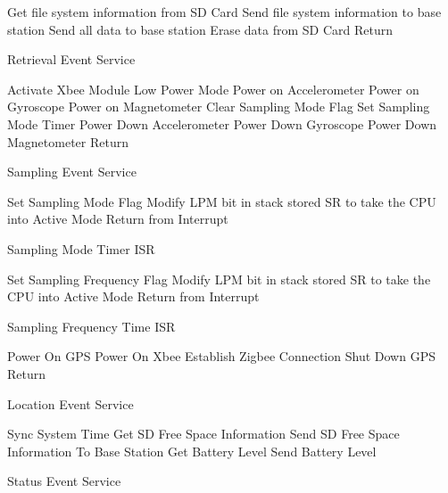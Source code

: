 \begin{algorithm}
\SetAlgoNoLine
Get file system information from SD Card\;
Send file system information to base station\;
Send all data to base station\;
Erase data from SD Card
Return\;
\caption{Retrieval Event Service}
\end{algorithm}

\begin{algorithm}
\SetAlgoNoLine
Activate Xbee Module Low Power Mode\;
Power on Accelerometer\;
Power on Gyroscope\;
Power on Magnetometer\;
Clear Sampling Mode Flag\;
Set Sampling Mode Timer\;
Power Down Accelerometer\;
Power Down Gyroscope\;
Power Down Magnetometer\;
Return\;
\caption{Sampling Event Service}
\end{algorithm}

\begin{algorithm}
\SetAlgoNoLine
Set Sampling Mode Flag\;
Modify LPM bit in stack stored SR to take the CPU into Active Mode\;
Return from Interrupt\;
\caption{Sampling Mode Timer ISR}
\end{algorithm}

\begin{algorithm}
\SetAlgoNoLine
Set Sampling Frequency Flag\;
Modify LPM bit in stack stored SR to take the CPU into Active Mode\;
Return from Interrupt\;
\caption{Sampling Frequency Time ISR}
\end{algorithm}

\begin{algorithm}
\SetAlgoNoLine
Power On GPS\;
Power On Xbee\;
Establish Zigbee Connection\;
Shut Down GPS\;
Return\;
\caption{Location Event Service}
\end{algorithm}

\begin{algorithm}[H]
\SetAlgoNoLine
Sync System Time\;
Get SD Free Space Information\;
Send SD Free Space Information To Base Station\;
Get Battery Level\;
Send Battery Level\;
\caption{Status Event Service}
\end{algorithm}
